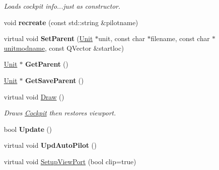 \begin{DoxyCompactItemize}
\begin{DoxyCompactList}\small\item\em Loads cockpit info...just as constructor. \end{DoxyCompactList}\item 
void {\bfseries recreate} (const std\+::string \&pilotname)\hypertarget{classCockpit_aabf7e31dd786dcf295fb1a2d83ce3096}{}\label{classCockpit_aabf7e31dd786dcf295fb1a2d83ce3096}

\item 
virtual void {\bfseries Set\+Parent} (\hyperlink{classUnit}{Unit} $\ast$unit, const char $\ast$filename, const char $\ast$\hyperlink{classCockpit_ac7211adcabf919204ebf498bb73adbd6}{unitmodname}, const Q\+Vector \&startloc)\hypertarget{classCockpit_a6db02cd8ce3e2e6ba024bc23a101580e}{}\label{classCockpit_a6db02cd8ce3e2e6ba024bc23a101580e}

\item 
\hyperlink{classUnit}{Unit} $\ast$ {\bfseries Get\+Parent} ()\hypertarget{classCockpit_a14f33431037e8420423acfa491bbe94a}{}\label{classCockpit_a14f33431037e8420423acfa491bbe94a}

\item 
\hyperlink{classUnit}{Unit} $\ast$ {\bfseries Get\+Save\+Parent} ()\hypertarget{classCockpit_ae87878913437d1c9ae664471f0efb0e9}{}\label{classCockpit_ae87878913437d1c9ae664471f0efb0e9}

\item 
virtual void \hyperlink{classCockpit_a77661eaba99c97a4bcb0192adaee01be}{Draw} ()\hypertarget{classCockpit_a77661eaba99c97a4bcb0192adaee01be}{}\label{classCockpit_a77661eaba99c97a4bcb0192adaee01be}

\begin{DoxyCompactList}\small\item\em Draws \hyperlink{classCockpit}{Cockpit} then restores viewport. \end{DoxyCompactList}\item 
bool {\bfseries Update} ()\hypertarget{classCockpit_a7f8bc1217ab41b5540bbd796954c9686}{}\label{classCockpit_a7f8bc1217ab41b5540bbd796954c9686}

\item 
virtual void {\bfseries Upd\+Auto\+Pilot} ()\hypertarget{classCockpit_ad7282e03bc3d3dba6141766931550fb9}{}\label{classCockpit_ad7282e03bc3d3dba6141766931550fb9}

\item 
virtual void \hyperlink{classCockpit_ad5ebe898866c1fc287b37aec2bb180d7}{Setup\+View\+Port} (bool clip=true)\hypertarget{classCockpit_ad5ebe898866c1fc287b37aec2bb180d7}{}\label{classCockpit_ad5ebe898866c1fc287b37aec2bb180d7}


\end{DoxyCompactItemize}
